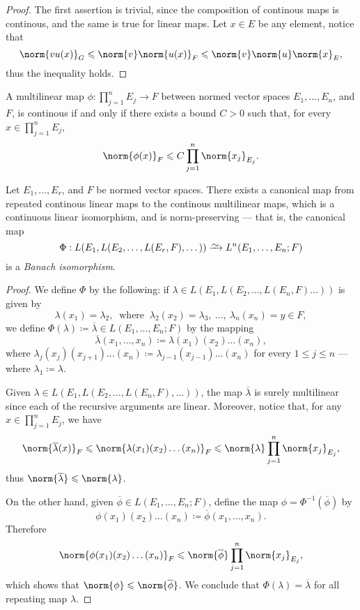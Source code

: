 \begin{proof}
The first assertion is trivial, since the composition of continous maps is
continous, and the same is true for linear maps. Let \(x \in E\) be any element,
notice that
\[
  \norm{vu(x)}_G
  \leq \norm{v} \norm{u(x)}_F
  \leq \norm{v} \norm{u} \norm{x}_{E},
\]
thus the inequality holds.
\end{proof}

\begin{proposition}
\label{prop:multilinear-continous-iff-bounded}
A multilinear map \(\phi: \prod_{j=1}^n E_j \to F\) between normed vector spaces
\(E_1, \dots, E_n\), and \(F\), is continous if and only if there exists a bound
\(C > 0\) such that, for every \(x \in \prod_{j = 1}^n E_j\),
\[
  \norm{\phi(x)}_{F} \leq C \prod_{j=1}^n \norm{x_j}_{E_j}.
\]
\end{proposition}

\begin{proposition}
\label{prop:canonical-iso-banach-multilinear}
Let \(E_1, \dots, E_r\), and \(F\) be normed vector spaces. There exists a
canonical map from repeated continous linear maps to the continous multilinear
maps, which is a continuous linear isomorphism, and is norm-preserving --- that
is, the canonical map
\[
  \Phi: L(E_1, L(E_2, \dots, L(E_r, F), \dots)) \isoto L^n(E_1, \dots, E_n; F)
\]
is a \emph{Banach isomorphism}.
\end{proposition}

\begin{proof}
We define \(\Phi\) by the following: if \(\lambda \in L(E_1, L(E_2, \dots,
L(E_n, F) \dots))\) is given by
\[
  \lambda(x_1) = \lambda_2,\ \text{ where }\ \lambda_2(x_2) = \lambda_3, \
  \dots, \ \lambda_n(x_n) = y \in F,
\]
we define \(\Phi(\lambda) \coloneq \overline{\lambda} \in L(E_1, \dots, E_n;
F)\) by the mapping
\[
  \overline\lambda(x_1, \dots, x_n) \coloneq \lambda(x_1)(x_2) \dots (x_n),
\]
where \(\lambda_j(x_j)(x_{j+1}) \dots (x_n) \coloneq \lambda_{j-1}(x_{j-1})
\dots (x_n)\) for every \(1 \leq j \leq n\) --- where \(\lambda_1 \coloneq
\lambda\).

Given \(\lambda \in L(E_1, L(E_2, \dots, L(E_n, F), \dots))\), the map
\(\overline\lambda\) is surely multilinear since each of the recursive arguments
are linear. Moreover, notice that, for any \(x \in \prod_{j=1}^n E_j\), we have
\[
  \norm{\overline\lambda(x)}_{F}
  \leq \norm{\lambda(x_1) (x_2) \dots (x_n)}_{F}
  \leq \norm{\lambda} \prod_{j=1}^n \norm{x_{j}}_{E_j},
\]
thus \(\norm{\overline\lambda} \leq \norm{\lambda}\).

On the other hand, given \(\overline\phi \in L(E_1, \dots, E_n; F)\), define the
map \(\phi = \Phi^{-1}(\overline\phi)\) by
\[
  \phi(x_1)(x_2) \dots (x_n) \coloneq \overline\phi(x_1, \dots, x_n).
\]
Therefore
\[
  \norm{\phi(x_1)(x_2) \dots (x_n)}_{F}
  \leq \norm{\overline\phi} \prod_{j=1}^n \norm{x_j}_{E_j},
\]
which shows that \(\norm{\phi} \leq \norm{\overline\phi}\). We conclude that
\(\Phi(\lambda) = \overline\lambda\) for all repeating map \(\lambda\).
\end{proof}

